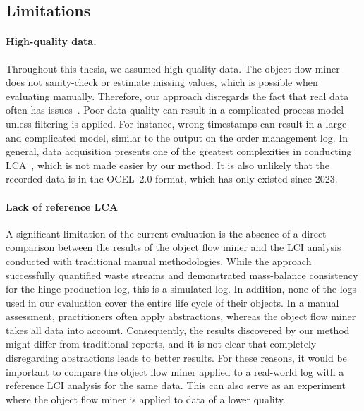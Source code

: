 \subsection{Limitations}



\paragraph{High-quality data.}
Throughout this thesis, we assumed high-quality data.
The object flow miner does not sanity-check or estimate missing values, which is possible when evaluating manually.
Therefore, our approach disregards the fact that real data often has issues~\autocite{ayres1995}.
Poor data quality can result in a complicated process model unless filtering is applied.
For instance, wrong timestamps can result in a large and complicated model, similar to the output on the order management log.
In general, data acquisition presents one of the greatest complexities in conducting LCA~\autocite{grahl}, which is not made easier by our method.
It is also unlikely that the recorded data is in the OCEL~2.0 format, which has only existed since 2023.



\paragraph{Lack of reference LCA}
A significant limitation of the current evaluation is the absence of a direct comparison between the results of the object flow miner and the LCI analysis conducted with traditional manual methodologies.
While the approach successfully quantified waste streams and demonstrated mass-balance consistency for the hinge production log, this is a simulated log.
In addition, none of the logs used in our evaluation cover the entire life cycle of their objects.
In a manual assessment, practitioners often apply abstractions, whereas the object flow miner takes all data into account.
Consequently, the results discovered by our method might differ from traditional reports, and it is not clear that completely disregarding abstractions leads to better results.
For these reasons, it would be important to compare the object flow miner applied to a real-world log with a reference LCI analysis for the same data.
This can also serve as an experiment where the object flow miner is applied to data of a lower quality.



